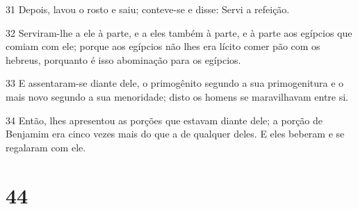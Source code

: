 \par 31 Depois, lavou o rosto e saiu; conteve-se e disse: Servi a refeição.
\par 32 Serviram-lhe a ele à parte, e a eles também à parte, e à parte aos egípcios que comiam com ele; porque aos egípcios não lhes era lícito comer pão com os hebreus, porquanto é isso abominação para os egípcios.
\par 33 E assentaram-se diante dele, o primogênito segundo a sua primogenitura e o mais novo segundo a sua menoridade; disto os homens se maravilhavam entre si.
\par 34 Então, lhes apresentou as porções que estavam diante dele; a porção de Benjamim era cinco vezes mais do que a de qualquer deles. E eles beberam e se regalaram com ele.

\chapter{44}

